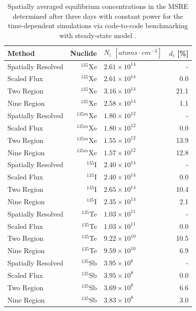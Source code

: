 \documentclass{style/nseJournal}
\begin{document}
\begin{table}[H]
    \centering
    \caption{Spatially averaged equilibrium concentrations in the MSRE determined after three days with constant power for the time-dependent simulations via code-to-code benchmarking with steady-state model \cite{shahbazi_steady-state_2022}.}
    \begin{tabular}{lrlr}
    \hline
    Method & Nuclide & $N_{i}$ $[atoms \cdot cm^{-3}]$ & $d_i$ [\%]\\
    \hline
Spatially Resolved	& $^{135}$Xe	& $2.61 \times 10^{14}$ &	- \\
Scaled Flux	&$^{135}$Xe	&$2.61 \times 10^{14}$	&0.0 \\
Two Region \cite{shahbazi_steady-state_2022}	&$^{135}$Xe	&$3.16 \times 10^{14}$	&21.1\\
Nine Region \cite{shahbazi_steady-state_2022}	&$^{135}$Xe	&$2.58 \times 10^{14}$	&1.1 \\
Spatially Resolved	&$^{135m}$Xe	&$1.80 \times 10^{12}$	&- \\
Scaled Flux	&$^{135m}$Xe	&$1.80 \times 10^{12}$	&0.0 \\
Two Region \cite{shahbazi_steady-state_2022}	&$^{135m}$Xe	&$1.55 \times 10^{12}$	&13.9 \\
Nine Region \cite{shahbazi_steady-state_2022}	&$^{135m}$Xe	&$1.57 \times 10^{12}$	&12.8 \\
Spatially Resolved	&$^{135}$I	&$2.40 \times 10^{14}$	&- \\
Scaled Flux	&$^{135}$I	&$2.40 \times 10^{14}$	&0.0 \\
Two Region \cite{shahbazi_steady-state_2022}	&$^{135}$I	&$2.65 \times 10^{14}$	&10.4 \\
Nine Region \cite{shahbazi_steady-state_2022}	&$^{135}$I	&$2.35 \times 10^{14}$	&2.1 \\
Spatially Resolved	&$^{135}$Te	&$1.03 \times 10^{11}$	&- \\
Scaled Flux	&$^{135}$Te	&$1.03 \times 10^{11}$	&0.0 \\
Two Region \cite{shahbazi_steady-state_2022}	&$^{135}$Te	&$9.22 \times 10^{10}$	&10.5 \\
Nine Region \cite{shahbazi_steady-state_2022}	&$^{135}$Te	&$9.59 \times 10^{10}$	&6.9 \\
Spatially Resolved	&$^{135}$Sb	&$3.95 \times 10^{8}$	&- \\
Scaled Flux	&$^{135}$Sb	&$3.95 \times 10^{8}$	&0.0 \\
Two Region \cite{shahbazi_steady-state_2022}	&$^{135}$Sb	&$3.69 \times 10^{8}$	&6.6 \\
Nine Region \cite{shahbazi_steady-state_2022}	&$^{135}$Sb	&$3.83 \times 10^{8}$	&3.0 \\
    \hline
    \end{tabular}
    \label{tab:mortycompare}
\end{table}
\end{document}
